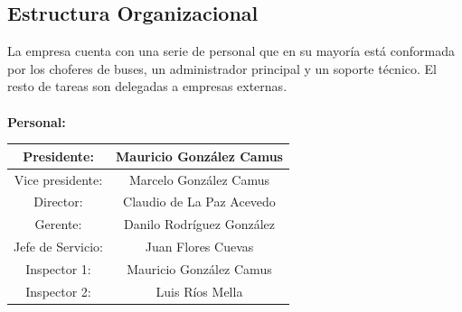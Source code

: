 \documentclass[12pt]{article}
\begin{document}
\subsection{Estructura Organizacional}
La empresa cuenta con una serie de personal que en su mayoría está conformada por los choferes de buses, un administrador principal y un soporte técnico. El resto de tareas son delegadas a empresas externas.\\\\
\textbf{Personal:}
    \begin{center}
        \begin{table}[!h]
            \centering
            \begin{tabular}{|c|c|}
                \hline
                Presidente: & Mauricio González Camus \\
                \hline
                Vice presidente: & Marcelo González Camus \\
                \hline
                Director: & Claudio de La Paz Acevedo \\
                \hline
                Gerente: & Danilo Rodríguez González \\
                \hline
                Jefe de Servicio: & Juan Flores Cuevas \\
                \hline
                Inspector 1: & Mauricio González Camus \\
                \hline
                Inspector 2: & Luis Ríos Mella \\
                \hline
            \end{tabular}
        \end{table}
    \end{center}
    
\end{document}
